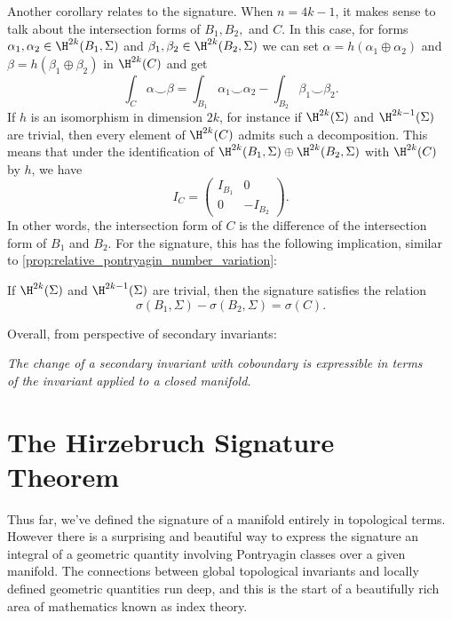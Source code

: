 Another corollary relates to the signature. When $n=4k-1$, it makes sense to talk about the intersection forms of $B_1,B_2,$ and $C$. In this case, for forms $\alpha_1,\alpha_2\in \H^{2k}(B_1, \Sigma)$ and $\beta_1,\beta_2\in \H^{2k}(B_2,\Sigma)$ we can set $\alpha=h(\alpha_1\oplus\alpha_2)$ and $\beta=h(\beta_1\oplus \beta_2)$ in $\H^{2k}(C)$ and get
\[
	\int_{C} \alpha\smile \beta = \int_{B_1} \alpha_1\smile \alpha_2 - \int_{B_2}\beta_1\smile \beta_2.
\]
If $h$ is an isomorphism in dimension $2k$, for instance if $\H^{2k}(\Sigma)$ and $\H^{2k-1}(\Sigma)$ are trivial, then every element of $\H^{2k}(C)$ admits such a decomposition. This means that under the identification of $\H^{2k}(B_1,\Sigma)\oplus \H^{2k}(B_2,\Sigma)$ with $\H^{2k}(C)$ by $h$, we have
\[
	I_C = \begin{pmatrix}I_{B_1} & 0 \\ 0 & -I_{B_2}\end{pmatrix}.
\]
In other words, the intersection form of $C$ is the difference of the intersection form of $B_1$ and $B_2$. For the signature, this has the following implication, similar to \cref{prop:relative_pontryagin_number_variation}:
\begin{proposition}\label{prop:signature_variation}
	If $\H^{2k}(\Sigma)$ and $\H^{2k-1}(\Sigma)$ are trivial, then the signature satisfies the relation
	\begin{equation}\label{eq:signature_variation}
		\sigma(B_1, \Sigma) - \sigma(B_2, \Sigma) = \sigma(C).
	\end{equation}
\end{proposition}

Overall, from perspective of secondary invariants:
\begin{center}
	\textsl{The change of a secondary invariant with coboundary is expressible in terms}\\
	\textsl{of the invariant applied to a closed manifold.}
\end{center}


\section{The Hirzebruch Signature Theorem}

Thus far, we've defined the signature of a manifold entirely in topological terms.
However there is a surprising and beautiful way to express the signature an integral of a geometric quantity involving Pontryagin classes over a given manifold.
The connections between global topological invariants and locally defined geometric quantities run deep, and this is the start of a beautifully rich area of mathematics known as index theory.

